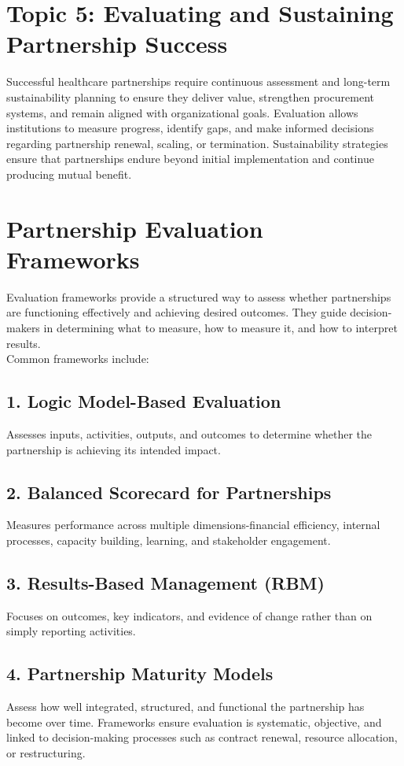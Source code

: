 \documentclass[10pt]{article}
\begin{document}
\section*{Topic 5: Evaluating and Sustaining Partnership Success}
Successful healthcare partnerships require continuous assessment and long-term sustainability planning to ensure they deliver value, strengthen procurement systems, and remain aligned with organizational goals. Evaluation allows institutions to measure progress, identify gaps, and make informed decisions regarding partnership renewal, scaling, or termination. Sustainability strategies ensure that partnerships endure beyond initial implementation and continue producing mutual benefit.

\section*{Partnership Evaluation Frameworks}
Evaluation frameworks provide a structured way to assess whether partnerships are functioning effectively and achieving desired outcomes. They guide decision-makers in determining what to measure, how to measure it, and how to interpret results.\\
Common frameworks include:

\subsection*{1. Logic Model-Based Evaluation}
Assesses inputs, activities, outputs, and outcomes to determine whether the partnership is achieving its intended impact.

\subsection*{2. Balanced Scorecard for Partnerships}
Measures performance across multiple dimensions-financial efficiency, internal processes, capacity building, learning, and stakeholder engagement.

\subsection*{3. Results-Based Management (RBM)}
Focuses on outcomes, key indicators, and evidence of change rather than on simply reporting activities.

\subsection*{4. Partnership Maturity Models}
Assess how well integrated, structured, and functional the partnership has become over time. Frameworks ensure evaluation is systematic, objective, and linked to decision-making processes such as contract renewal, resource allocation, or restructuring.
\end{document}

